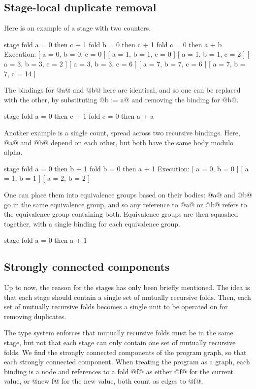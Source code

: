 \subsection{Stage-local duplicate removal}
Here is an example of a stage with two counters.
\begin{code}
stage {
  fold a = 0 then c + 1
  fold b = 0 then c + 1
  fold c = 0 then a + b
}
Execution:
[ a = 0, b = 0, c = 0 ]
[ a = 1, b = 1, c = 0 ]
[ a = 1, b = 1, c = 2 ]
[ a = 3, b = 3, c = 2 ]
[ a = 3, b = 3, c = 6 ]
[ a = 7, b = 7, c = 6 ]
[ a = 7, b = 7, c = 14 ]
\end{code}

The bindings for @a@ and @b@ here are identical, and so one can be replaced with the other, by substituting @b := a@ and removing the binding for @b@.
\begin{code}
stage {
  fold a = 0 then c + 1
  fold c = 0 then a + a
}
\end{code}

Another example is a single count, spread across two recursive bindings.
Here, @a@ and @b@ depend on each other, but both have the same body modulo alpha.
\begin{code}
stage {
  fold a = 0 then b + 1
  fold b = 0 then a + 1
}
Execution:
[ a = 0, b = 0 ]
[ a = 1, b = 1 ]
[ a = 2, b = 2 ]
\end{code}

One can place them into equivalence groups based on their bodies: @a@ and @b@ go in the same equivalence group, and so any reference to @a@ or @b@ refers to the equivalence group containing both.
Equivalence groups are then squashed together, with a single binding for each equivalence group.
\begin{code}
stage {
  fold a = 0 then a + 1
}
\end{code}




\subsection{Strongly connected components}
Up to now, the reason for the stages has only been briefly mentioned.
The idea is that each stage should contain a single set of mutually recursive folds.
Then, each set of mutually recursive folds becomes a single unit to be operated on for removing duplicates.

The type system enforces that mutually recursive folds must be in the same stage, but not that each stage can only contain one set of mutually recursive folds.
We find the strongly connected components of the program graph, so that each strongly connected component.
When treating the program as a graph, each binding is a node and references to a fold @f@ as either @f@ for the current value, or @new f@ for the new value, both count as edges to @f@.

